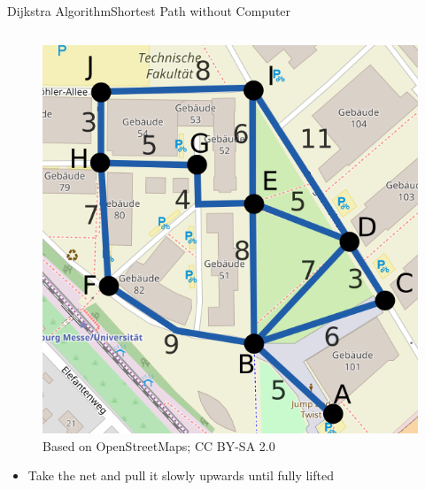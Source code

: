 \begin{frame}{Dijkstra Algorithm}{Shortest Path without Computer}
  \vspace{-1.5em}
  \begin{columns}
    \begin{column}{0.5\linewidth}
      \begin{figure}[!t]
        \includegraphics[width=0.6\linewidth]
          {Images/Dijkstra/DijkstraMapTF.png}
          \caption{Based on OpenStreetMaps; CC BY-SA 2.0}
      \end{figure}
      \vspace{-1.5em}
      \begin{itemize}
        \item
          Take the net and pull it slowly upwards until fully lifted
      \end{itemize}
    \end{column}
\end{columns}
\end{frame}
